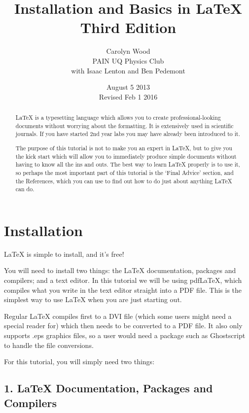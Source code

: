 \documentclass[a4paper]{article}
\begin{document}
\title{Installation and Basics in \LaTeX\\
Third Edition}
\author{Carolyn Wood\\
PAIN UQ Physics Club\\
with Isaac Lenton and Ben Pedemont}
\date{August 5 2013\\
Revised Feb 1 2016}
\maketitle

\begin{abstract}
LaTeX is a typesetting language which allows you to create
professional-looking documents without worrying about the
formatting. It is extensively used in scientific journals.
If you have started 2nd year labs you may have already been
introduced to it.

The purpose of this tutorial is not to make you an expert in
LaTeX, but to give you the kick start which will allow you
to immediately produce simple documents without having to
know all the ins and outs.
The best way to learn LaTeX properly is to use it, so perhaps
the most important part of this tutorial is the `Final Advice'
section, and the References, which you can use to find out how
to do just about anything LaTeX can do.
\end{abstract}

\clearpage
\tableofcontents
\clearpage

\section{Installation}
LaTeX is simple to install, and it's free!

You will need to install two things: the LaTeX documentation, packages
and compilers; and a text editor.
In this tutorial we will be using pdfLaTeX, which compiles what
you write in the text editor straight into a PDF file. This is
the simplest way to use LaTeX when you are just starting out.

Regular LaTeX compiles first to a DVI file (which some users
might need a special reader for) which then needs to be converted
to a PDF file. It also only supports .eps graphics files, so a
user would need a package such as Ghostscript to handle the file
conversions. 

For this tutorial, you will simply need two things:

\subsection*{1. LaTeX Documentation, Packages and Compilers}
\end{document}

